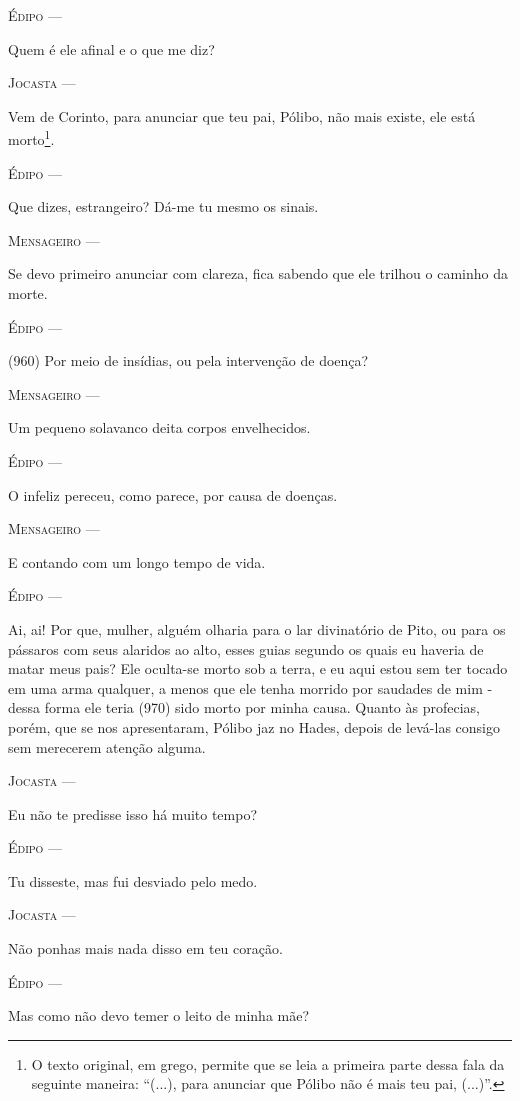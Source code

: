 \textsc{Édipo} ---

Quem é ele afinal e o que me diz?

\textsc{Jocasta} ---

Vem de Corinto, para anunciar que teu pai, Pólibo, não mais existe, ele
está morto\footnote{O texto original, em grego, permite que se leia a
  primeira parte dessa fala da seguinte maneira: ``(...), para anunciar
  que Pólibo não é mais teu pai, (...)''.}.

\textsc{Édipo} ---

Que dizes, estrangeiro? Dá-me tu mesmo os sinais.

\textsc{Mensageiro} ---

Se devo primeiro anunciar com clareza, fica sabendo que ele trilhou o
caminho da morte.

\textsc{Édipo} ---

(960) Por meio de insídias, ou pela intervenção de doença?

\textsc{Mensageiro} ---

Um pequeno solavanco deita corpos envelhecidos.

\textsc{Édipo} ---

O infeliz pereceu, como parece, por causa de doenças.

\textsc{Mensageiro} ---

E contando com um longo tempo de vida.

\textsc{Édipo} ---

Ai, ai! Por que, mulher, alguém olharia para o lar divinatório de Pito,
ou para os pássaros com seus alaridos ao alto, esses guias segundo os
quais eu haveria de matar meus pais? Ele oculta-se morto sob a terra, e
eu aqui estou sem ter tocado em uma arma qualquer, a menos que ele tenha
morrido por saudades de mim - dessa forma ele teria (970) sido morto por
minha causa. Quanto às profecias, porém, que se nos apresentaram, Pólibo
jaz no Hades, depois de levá-las consigo sem merecerem atenção alguma.

\textsc{Jocasta} ---

Eu não te predisse isso há muito tempo?

\textsc{Édipo} ---

Tu disseste, mas fui desviado pelo medo.

\textsc{Jocasta} ---

Não ponhas mais nada disso em teu coração.

\textsc{Édipo} ---

Mas como não devo temer o leito de minha mãe?

